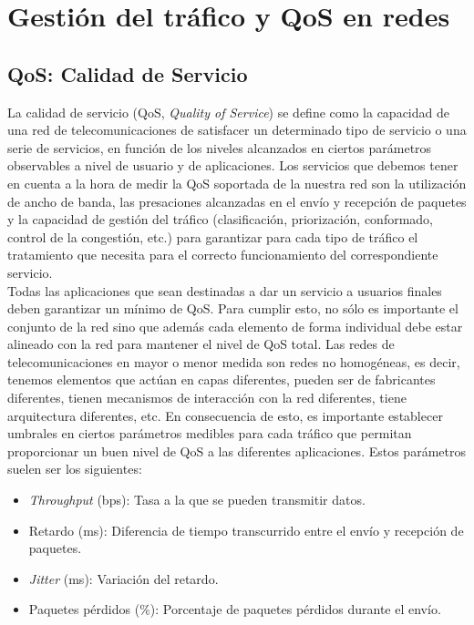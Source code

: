 \section{Gestión del tráfico y QoS en redes}

\subsection{QoS: Calidad de Servicio}
La calidad de servicio (QoS, \textit{Quality of Service}) se define como la capacidad de una red de telecomunicaciones de satisfacer un determinado tipo de servicio o una serie de servicios, en función de los niveles alcanzados en ciertos parámetros observables a nivel de usuario y de aplicaciones. Los servicios que debemos tener en cuenta a la hora de medir la QoS soportada de la nuestra red son la utilización de ancho de banda, las presaciones alcanzadas en el envío y recepción de paquetes y la capacidad de gestión del tráfico (clasificación, priorización, conformado, control de la congestión, etc.) para garantizar para cada tipo de tráfico el tratamiento que necesita para el correcto funcionamiento del correspondiente servicio.\\

Todas las aplicaciones que sean destinadas a dar un servicio a usuarios finales deben garantizar un mínimo de QoS. Para cumplir esto, no sólo es importante el conjunto de la red sino que además cada elemento de forma individual debe estar alineado con la red para mantener el nivel de QoS total. Las redes de telecomunicaciones en mayor o menor medida son redes no homogéneas, es decir, tenemos elementos que actúan en capas diferentes, pueden ser de fabricantes diferentes, tienen mecanismos de interacción con la red diferentes, tiene arquitectura diferentes, etc. En consecuencia de esto, es importante establecer umbrales en ciertos parámetros medibles para cada tráfico que permitan proporcionar un buen nivel de QoS a las diferentes aplicaciones. Estos parámetros suelen ser los siguientes:

\begin{itemize}
    \item \textit{Throughput} (bps): Tasa a la que se pueden transmitir datos.
    \item Retardo (ms): Diferencia de tiempo transcurrido entre el envío y recepción de paquetes.
    \item \textit{Jitter} (ms): Variación del retardo.
    \item Paquetes pérdidos (\%): Porcentaje de paquetes pérdidos durante el envío.
\end{itemize}

